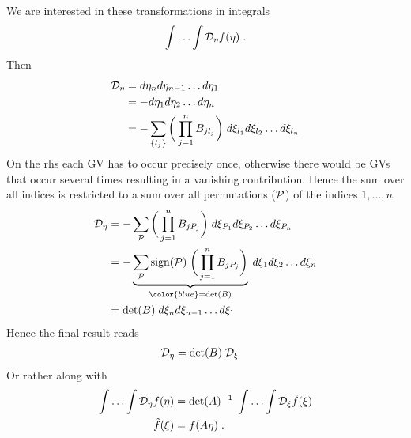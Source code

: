We are interested in these transformations in integrals
%
\begin{align*}
\int\ldots\int {\cal D}_{\eta} f(\eta)\;.
\end{align*}
%
Then
%
\begin{align*}
{\cal D}_{\eta} &= d \eta_{n} d\eta_{n-1} \ldots d\eta_{1} \\
&=- d \eta_{1} d\eta_{2} \ldots d\eta_{n} \\
&=-\sum_{\{l_{j}\}}\bigg(\prod_{j=1}^{n} B_{j l_{j}}\bigg) \; d \xi_{l_{1}}d \xi_{l_{2}}\ldots d \xi_{l_{n}}
\end{align*}
%
On the rhs each GV has to occur precisely once, otherwise there would be GVs that occur several times resulting in a vanishing contribution. Hence the sum over all indices is restricted to
a sum over all permutations (${\cal P} $) of the indices $1,\ldots,n$
%
\begin{align*}
\Deta 
&=
-\sum_{\cP }
\bigg(\prod_{j=1}^{n} B_{j P_{j}}\bigg) \; d \xi_{P_{1}}d \xi_{P_{2}}\ldots d \xi_{P_{n}}\\
&=-
\underbrace{
\sum_{\cP }\text{sign}(\cP )\;
\bigg(\prod_{j=1}^{n} B_{j P_{j}}\bigg)
}_{\color{blue} = \det(B)} \; d \xi_{1}d \xi_{2}\ldots d \xi_{n}\\
&=\det(B) \; d \xi_{n}d \xi_{n-1}\ldots d \xi_{1}
\end{align*}
%
Hence the final result reads
%
\begin{align}\label{eq:}
{\cal D}_{\eta} &= \det(B) \;{\cal D}_{\xi} 
\end{align}
%
Or rather along with  
%
\begin{align}\label{eq:}
\int\ldots\int {\cal D}_{\eta} f(\eta) &= \det(A)^{-1}\; \int \ldots\int {\cal D}_{\xi} \tilde f(\xi)\\
\tilde f(\xi) &= f(A\eta)\;.
\end{align}
%


	

